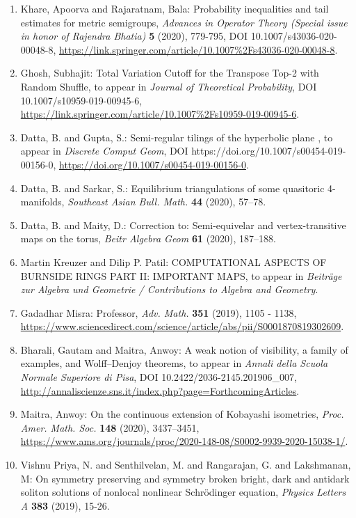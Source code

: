 \begin{enumerate}
\item Khare, Apoorva and Rajaratnam, Bala: Probability inequalities and tail estimates for metric semigroups, \emph{Advances in Operator Theory (Special issue in honor of Rajendra Bhatia)} {\bf 5} (2020), 779-795, DOI 10.1007/s43036-020-00048-8, \url{https://link.springer.com/article/10.1007%2Fs43036-020-00048-8}.
\item Ghosh, Subhajit: Total Variation Cutoff for the Transpose Top-2 with Random Shuffle, to appear in \emph{Journal of Theoretical Probability}, DOI 10.1007/s10959-019-00945-6, \url{https://link.springer.com/article/10.1007%2Fs10959-019-00945-6}.
\item Datta, B. and Gupta, S.: Semi-regular tilings of the hyperbolic plane \label{bdsg_2019}, to appear in \emph{Discrete Comput Geom}, DOI https://doi.org/10.1007/s00454-019-00156-0, \url{https://doi.org/10.1007/s00454-019-00156-0}.
\item Datta, B. and Sarkar, S.: Equilibrium triangulations of some quasitoric 4-manifolds, \emph{Southeast Asian Bull. Math.} {\bf 44} (2020), 57--78.
\item Datta, B. and Maity, D.: Correction to: Semi-equivelar and vertex-transitive maps on the torus, \emph{Beitr Algebra Geom} {\bf 61} (2020), 187--188.
\item Martin Kreuzer and Dilip P. Patil: COMPUTATIONAL ASPECTS OF BURNSIDE RINGS PART II: IMPORTANT MAPS, to appear in \emph{Beiträge zur Algebra und Geometrie / Contributions to Algebra and Geometry}.
\item Gadadhar Misra: Professor, \emph{Adv. Math.} {\bf 351} (2019), 1105 - 1138, \url{https://www.sciencedirect.com/science/article/abs/pii/S0001870819302609}.
\item Bharali, Gautam and Maitra, Anwoy: A weak notion of visibility, a family of examples, and Wolff--Denjoy theorems, to appear in \emph{Annali della Scuola Normale Superiore di Pisa}, DOI 10.2422/2036-2145.201906\_007, \url{http://annaliscienze.sns.it/index.php?page=ForthcomingArticles}.
\item Maitra, Anwoy: On the continuous extension of Kobayashi isometries, \emph{Proc. Amer. Math. Soc.} {\bf 148} (2020), 3437--3451, \url{https://www.ams.org/journals/proc/2020-148-08/S0002-9939-2020-15038-1/}.
\item Vishnu Priya, N. and Senthilvelan, M. and  Rangarajan, G. and Lakshmanan, M: On symmetry preserving and symmetry broken bright, dark and antidark soliton solutions of nonlocal nonlinear Schrödinger equation, \emph{Physics Letters A} {\bf 383} (2019), 15-26.

\end{enumerate}
